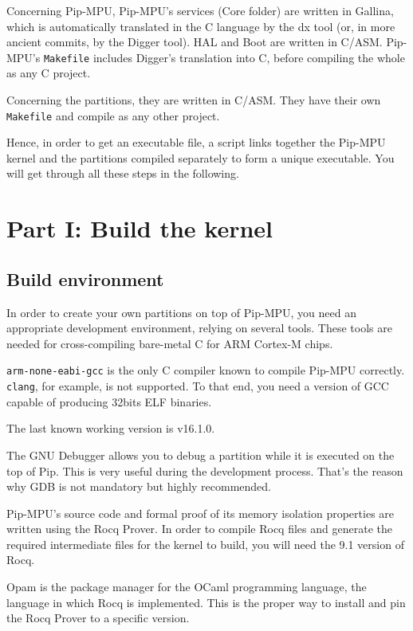 \documentclass[10pt,a4paper,titlepage]{refart}
\begin{document}
Concerning Pip-MPU, Pip-MPU's services (Core folder) are written in Gallina, which is automatically translated in the C language by the dx tool 
(or, in more ancient commits, by the Digger tool). HAL and Boot are written in C/ASM.
Pip-MPU's \texttt{Makefile} includes Digger's translation into C, before compiling the whole as any C project.

Concerning the partitions, they are written in C/ASM.
They have their own \texttt{Makefile} and compile as any other project.

Hence, in order to get an executable file, a script links together the Pip-MPU kernel and the partitions compiled separately to form a unique executable.
You will get through all these steps in the following.

\section{Part I: Build the kernel} \label{first}

\subsection{Build environment}
In order to create your own partitions on top of Pip-MPU, you need an appropriate development environment, relying on several tools.
These tools are needed for cross-compiling bare-metal C for ARM Cortex-M chips.

\texttt{arm-none-eabi-gcc} is the only C compiler known to compile Pip-MPU correctly.
\texttt{clang}, for example, is not supported. To that end, you need a version of GCC capable of producing 32bits ELF binaries.

The last known working version is v16.1.0.

 
The GNU Debugger allows you to debug a partition while it is executed on the
top of Pip. This is very useful during the development process. That's the
reason why GDB is not mandatory but highly recommended.

Pip-MPU's source code and formal proof of its memory isolation properties are written
using the Rocq Prover. In order to compile Rocq files and
generate the required intermediate files for the kernel to build, you will need the 9.1 version of Rocq.

 
Opam is the package manager for the OCaml programming language, the language in
which Rocq is implemented. This is the proper way to install and pin the Rocq
Prover to a specific version.
\end{document}
